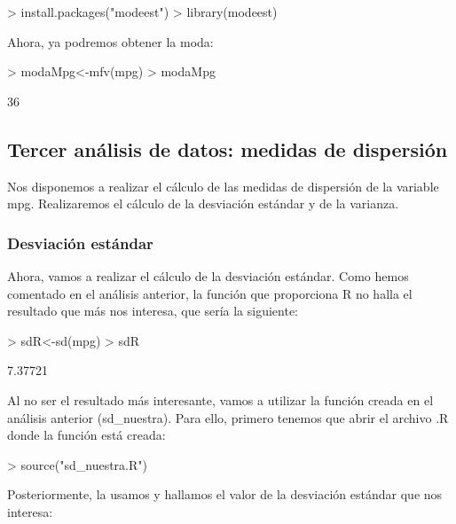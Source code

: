 \documentclass [a4paper] {article}
\begin{document}
\begin{Schunk}
\begin{Sinput}
> install.packages("modeest")
> library(modeest)
\end{Sinput}
\end{Schunk}


Ahora, ya podremos obtener la moda:

\begin{Schunk}
\begin{Sinput}
> modaMpg<-mfv(mpg)
> modaMpg
\end{Sinput}
\begin{Soutput}
[1] 36
\end{Soutput}
\end{Schunk}

\subsection{Tercer análisis de datos: medidas de dispersión}
Nos disponemos a realizar el cálculo de las medidas de dispersión de la variable mpg. Realizaremos el cálculo de
la desviación estándar y de la varianza.

\subsubsection{Desviación estándar}
Ahora, vamos a realizar el cálculo de la desviación estándar. Como hemos comentado en el análisis anterior,
la función que proporciona R no halla el resultado que más nos interesa, que sería la siguiente:

\begin{Schunk}
\begin{Sinput}
> sdR<-sd(mpg)
> sdR
\end{Sinput}
\begin{Soutput}
[1] 7.37721
\end{Soutput}
\end{Schunk}

Al no ser el resultado más interesante, vamos a utilizar la función creada en el análisis anterior (sd_nuestra). Para
ello, primero tenemos que abrir el archivo .R donde la función está creada:

\begin{Schunk}
\begin{Sinput}
> source("sd_nuestra.R")
\end{Sinput}
\end{Schunk}

Posteriormente, la usamos y hallamos el valor de la desviación estándar que nos interesa:
\end{document}
